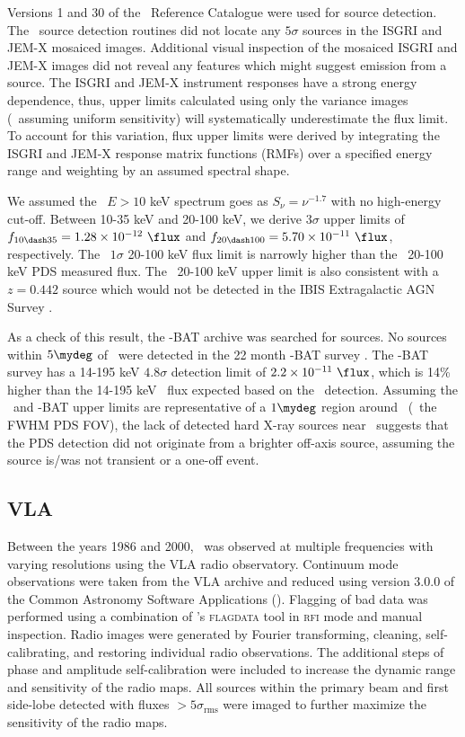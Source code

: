 \documentclass[useAMS,usenatbib]{mn2e}
\begin{document}
Versions 1 and 30 of the \integral\ Reference Catalogue were used for
source detection. The \osa\ source detection routines did not locate
any $5\sigma$ sources in the ISGRI and JEM-X mosaiced
images. Additional visual inspection of the mosaiced ISGRI and JEM-X
images did not reveal any features which might suggest emission from a
source. The ISGRI and JEM-X instrument responses have a strong energy
dependence, thus, upper limits calculated using only the variance
images (\ie\ assuming uniform sensitivity) will systematically
underestimate the flux limit. To account for this variation, flux
upper limits were derived by integrating the ISGRI and JEM-X response
matrix functions (RMFs) over a specified energy range and weighting by
an assumed spectral shape.

We assumed the \irs\ $E> 10$ keV spectrum goes as $S_{\nu} =
\nu^{-1.7}$ with no high-energy cut-off. Between 10-35 keV and 20-100
keV, we derive $3\sigma$ upper limits of $f_{10 \dash 35} = 1.28
\times 10^{-12} ~\flux$ and $f_{20 \dash 100} = 5.70 \times 10^{-11}
~\flux$, respectively. The \integral\ $1\sigma$ 20-100 keV flux limit
is narrowly higher than the \bepposax\ 20-100 keV PDS measured
flux. The \integral\ 20-100 keV upper limit is also consistent with a
$z = 0.442$ source which would not be detected in the IBIS
Extragalactic AGN Survey \citep{2006ApJ...636L..65B}.

As a check of this result, the \swift-BAT archive was searched for
sources. No sources within $5\mydeg$ of \irs\ were detected in the 22
month \swift-BAT survey \citep{2010ApJS..186..378T}. The \swift-BAT
survey has a 14-195 keV $4.8\sigma$ detection limit of $2.2 \times
10^{-11} ~\flux$, which is 14\% higher than the 14-195 keV \irs\ flux
expected based on the \bepposax\ detection. Assuming the
\integral\ and \swift-BAT upper limits are representative of a
$1\mydeg$ region around \irs\ (\ie\ the FWHM PDS FOV), the lack of
detected hard X-ray sources near \irs\ suggests that the PDS detection
did not originate from a brighter off-axis source, assuming the source
is/was not transient or a one-off event.

\subsection{VLA}
\label{sec:vla}

Between the years 1986 and 2000, \irs\ was observed at multiple
frequencies with varying resolutions using the VLA radio
observatory. Continuum mode observations were taken from the VLA
archive and reduced using version 3.0.0 of the Common Astronomy
Software Applications (\casa). Flagging of bad data was performed
using a combination of \casa's {\textsc{flagdata}} tool in
{\textsc{rfi}} mode and manual inspection. Radio images were generated
by Fourier transforming, cleaning, self-calibrating, and restoring
individual radio observations. The additional steps of phase and
amplitude self-calibration were included to increase the dynamic range
and sensitivity of the radio maps. All sources within the primary beam
and first side-lobe detected with fluxes $> 5\sigma_{\mathrm{rms}}$
were imaged to further maximize the sensitivity of the radio maps.
\end{document}
